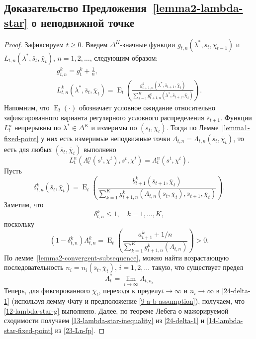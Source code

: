 \documentclass[a4paper,12pt,russian]{article} %
\theoremstyle{definition}
\DeclareMathOperator{\E}{E}
\begin{document}
\subsection{Доказательство Предложения~\ref{lemma2-lambda-star} о неподвижной точке}
\begin{proof}
Зафиксируем $t\ge 0$.
Введем $\Delta^K$-значные функции $g_{t,n}(\lambda^*, \bar s_t, \bar\chi_{t-1})$ и $L_{t,n}(\lambda^*, \bar s_t, \bar\chi_{t})$, $n=1,2,\dots$, следующим образом:
\begin{gather*}
g_{t,n}^k = g_{t}^k + \frac 1 n,\\
L_{t,n}^k(\lambda^*, \bar s_t,\bar\chi_t) = \E_t\left(
  \frac{g_{t+1,n}^k(\lambda^*,\bar s_{t+1}, \bar\chi_t)}
       {\sum_{k=1}^K g_{t+1,n}^k(\lambda^*, \bar s_{t+1}, \bar\chi_t)} 
  \right).
\end{gather*}
Напомним, что $\E_t(\cdot)$ обозначает условное ожидание относительно зафиксированного варианта регулярного условного распределения $\bar s_{t+1}$. Функции $L^n_t$ непрерывны по $\lambda^*\in \Delta^K$ и измеримы по $(\bar s_t, \bar\chi_{t})$.
Тогда по Лемме~\ref{lemma1-fixed-point} у них есть измеримые неподвижные точки $\Lambda_{t,n} = \Lambda_{t,n}(\bar s_t, \bar\chi_t)$, то есть для любых $(\bar s_t,\bar \chi_t)$ выполнено
\begin{equation}
\label{23-Ln-fp}
L_t^n(\Lambda_t^n(s^t,\chi^t), s^t, \chi^t)
= \Lambda_t^n(s^t,\chi^t).
\end{equation}
Пусть
\[
\delta_{t,n}^k(\bar s_t,\bar\chi_t) 
= \E_t \left(
  \frac{b_{t+1}^k( \bar s_{t+1}, \bar\chi_t)}
       {\sum_{k=1}^K 
         g_{t+1,n}^k(\Lambda_{t,n}(\bar s_t, \bar\chi_t), \bar s_{t+1}, \bar\chi_t)}
  \right).
\]
Заметим, что 
\begin{equation}
\label{24-delta-1}
\delta_{t,n}^k \le 1, \quad k=1,\dots,K,
\end{equation}
поскольку
\[
(1-\delta_{t,n}^k)\Lambda_{t,n}^k 
= \E_t\left( 
  \frac{a_{t+1}^k + 1/n}
       {\sum_{k=1}^K g_{t+1,n}^k(\Lambda_{t,n})}
  \right) > 0.
\]
По лемме~\ref{lemma2-convergent-subsequence}, можно найти возрастающую последовательность $n_i = n_i(\bar s_t, \bar\chi_t)$, $i=1,2,\dots$ такую, что существует предел
\[
\Lambda^*_{t} = \lim_{i\to\infty} \Lambda_{t,n_i}
\]
Теперь, для фиксированного $\bar \chi_t$, переходя к пределу$i\to\infty$ и $n_i\to\infty$ в \eqref{24-delta-1} (используя лемму Фату и предположение \eqref{9-a-b-assumption}), получаем, что \eqref{12-lambda-star-g} выполнено.
Далее, по теореме Лебега о мажорируемой сходимости получаем \eqref{13-lambda-star-inequality} из \eqref{24-delta-1} и \eqref{14-lambda-star-fixed-point} из \eqref{23-Ln-fp}.

\end{proof}
\end{document}

